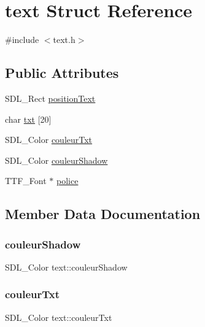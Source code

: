 \hypertarget{structtext}{}\section{text Struct Reference}
\label{structtext}


{\ttfamily \#include $<$text.\+h$>$}

\subsection*{Public Attributes}
\begin{DoxyCompactItemize}
\item 
S\+D\+L\+\_\+\+Rect \hyperlink{structtext_a01cc24369eccbe9ccb68af9a748315d3}{position\+Text}
\item 
char \hyperlink{structtext_afd7610607c0ade6ed450f86e275ddce5}{txt} \mbox{[}20\mbox{]}
\item 
S\+D\+L\+\_\+\+Color \hyperlink{structtext_a0f3134d4dbc64c9b28fa625fb627f9c5}{couleur\+Txt}
\item 
S\+D\+L\+\_\+\+Color \hyperlink{structtext_ae2c25de3d806d9d99afca8d5d41cc4c4}{couleur\+Shadow}
\item 
T\+T\+F\+\_\+\+Font $\ast$ \hyperlink{structtext_aec9ba02a1c093b1db8aa0f16ac092459}{police}
\end{DoxyCompactItemize}


\subsection{Member Data Documentation}
\mbox{\label{structtext_ae2c25de3d806d9d99afca8d5d41cc4c4}} 
\subsubsection{\texorpdfstring{couleur\+Shadow}{couleurShadow}}
{\footnotesize\ttfamily S\+D\+L\+\_\+\+Color text\+::couleur\+Shadow}

\mbox{\label{structtext_a0f3134d4dbc64c9b28fa625fb627f9c5}} 
\subsubsection{\texorpdfstring{couleur\+Txt}{couleurTxt}}
{\footnotesize\ttfamily S\+D\+L\+\_\+\+Color text\+::couleur\+Txt}

